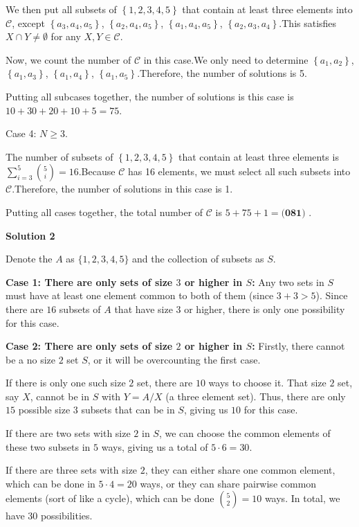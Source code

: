 \begin{enumerate}
 We then put all subsets of $\left\{ 1, 2, 3, 4, 5 \right\}$ that contain at least three elements into $\mathcal C$, except $\left\{ a_3, a_4, a_5 \right\}$, $\left\{ a_2, a_4, a_5 \right\}$, $\left\{ a_1, a_4, a_5 \right\}$, $\left\{ a_2, a_3, a_4 \right\}$.This satisfies $X \cap Y \neq \emptyset$ for any $X, Y \in \mathcal C$.

 Now, we count the number of $\mathcal C$ in this case.We only need to determine $\left\{ a_1, a_2 \right\}$, $\left\{ a_1, a_3 \right\}$, $\left\{ a_1, a_4 \right\}$, $\left\{ a_1, a_5 \right\}$.Therefore, the number of solutions is 5.

 Putting all subcases together, the number of solutions is this case is $10 + 30 + 20 + 10 + 5 = 75$.

 Case 4: $N \geq 3$.

 The number of subsets of $\left\{ 1, 2, 3, 4, 5 \right\}$ that contain at least three elements is $\sum_{i=3}^5 \binom{5}{i} = 16$.Because $\mathcal C$ has 16 elements, we must select all such subsets into $\mathcal C$.Therefore, the number of solutions in this case is 1.

 Putting all cases together, the total number of $\mathcal C$ is $5 + 75 + 1 = \boxed{\textbf{(081) }}$.

 



\textbf{Solution 2}

Denote the $A$ as $\{ 1,2,3,4,5 \}$ and the collection of subsets as $S$. 

 
\textbf{Case 1: There are only sets of size $3$ or higher in $S$:  }Any two sets in $S$ must have at least one element common to both of them (since $3+3>5$). Since there are $16$ subsets of $A$ that have size $3$ or higher, there is only one possibility for this case.

 
\textbf{Case 2: There are only sets of size $2$ or higher in $S$:  }Firstly, there cannot be a no size $2$ set $S$, or it will be overcounting the first case.

 If there is only one such size $2$ set, there are $10$ ways to choose it. That size $2$ set, say $X$, cannot be in $S$ with $Y = A/X$ (a three element set). Thus, there are only $15$ possible size $3$ subsets that can be in $S$, giving us $10$ for this case.

 If there are two sets with size $2$ in $S$, we can choose the common elements of these two subsets in $5$ ways, giving us a total of $5\cdot 6 = 30$.

 If there are three sets with size $2$, they can either share one common element, which can be done in $5 \cdot 4 = 20$ ways, or they can share pairwise common elements (sort of like a cycle), which can be done $\binom{5}{2} = 10$ ways. In total, we have $30$ possibilities.


\end{enumerate}

